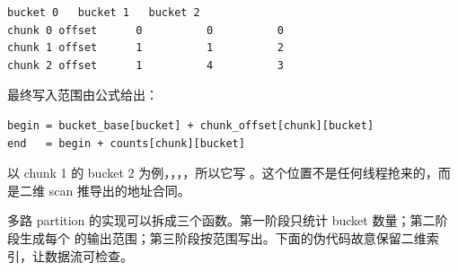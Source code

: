 \begin{lstlisting}[numbers=none,caption={每个 bucket 沿 chunk 维度的 exclusive scan}]
                 bucket 0   bucket 1   bucket 2
chunk 0 offset      0          0          0
chunk 1 offset      1          1          2
chunk 2 offset      1          4          3
\end{lstlisting}

最终写入范围由公式给出：

\begin{lstlisting}[numbers=none]
begin = bucket_base[bucket] + chunk_offset[chunk][bucket]
end   = begin + counts[chunk][bucket]
\end{lstlisting}

以 chunk 1 的 bucket 2 为例，，，，所以它写 \code{[9, 10)}。这个位置不是任何线程抢来的，而是二维 scan 推导出的地址合同。

多路 partition 的实现可以拆成三个函数。第一阶段只统计 bucket 数量；第二阶段生成每个  的输出范围；第三阶段按范围写出。下面的伪代码故意保留二维索引，让数据流可检查。

